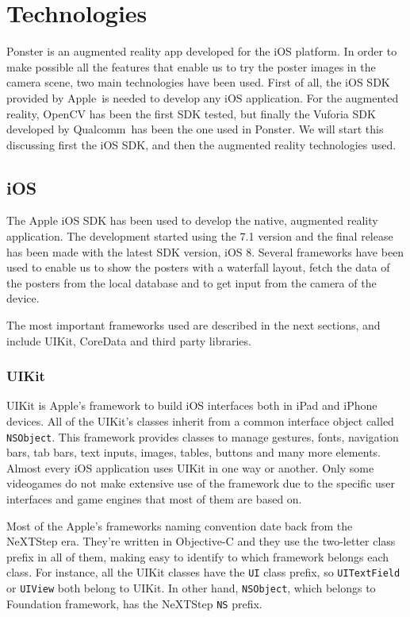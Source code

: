 \chapter{Technologies}
Ponster is an augmented reality app developed for the iOS platform. In order to make
possible all the features that enable us to try the poster images in the camera
scene, two main technologies have been used. First of all, the iOS SDK provided by
Apple\textregistered ~is needed to develop any iOS application. For the augmented reality, OpenCV
has been the first SDK tested, but finally the Vuforia SDK\cite{vuforia} developed
by Qualcomm\textregistered ~has been the one used in Ponster. We will start this
discussing first the iOS SDK, and then the augmented reality technologies used.

\section{iOS}
The Apple iOS SDK has been used to develop the native, augmented reality
application. The development started using the 7.1 version and the final release has
been made with the latest SDK version, iOS 8. Several frameworks have been used to
enable us to show the posters with a waterfall layout, fetch the data of the posters
from the local database and to get input from the camera of the device.

The most important frameworks used are described in the next sections, and include
UIKit, CoreData and third party libraries.

\subsection{UIKit}
UIKit\cite{uikit} is Apple's framework to build iOS interfaces both in iPad and
iPhone devices. All of the UIKit's classes inherit from a common interface object
called \texttt{NSObject}. This framework provides classes to manage gestures, fonts,
navigation bars, tab bars, text inputs, images, tables, buttons and many more
elements. Almost every iOS application uses UIKit in one way or another. Only some
videogames do not make extensive use of the framework due to the specific user
interfaces and game engines that most of them are based on.

Most of the Apple's frameworks naming convention date back from the NeXTStep era. They're written in
Objective-C and they use the two-letter class prefix in all of them, making easy to
identify to which framework belongs each class. For instance, all the UIKit classes
have the \texttt{UI} class prefix, so \texttt{UITextField} or \texttt{UIView} both
belong to UIKit. In other hand, \texttt{NSObject}, which belongs to Foundation
framework, has the NeXTStep \texttt{NS} prefix.

